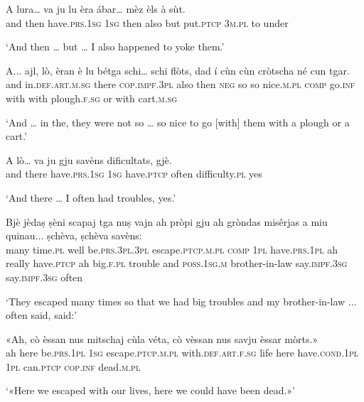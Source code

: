 \begin{linenumbers}
\gll   A lura… va ju lu èra ábar… mèz èls à sùt. \\
and then have.\textsc{prs.1sg} \textsc{1sg} then also but put.\textsc{ptcp} \textsc{3m.pl} to under \\
\end{linenumbers}
\medskip
\glt `And then … but … I also happened to yoke them.'
\medskip

\begin{linenumbers}
\gll  A... ajl, lò, èran è lu bétga schi… schi flòts, dad í cùn cùn cròtscha né cun tgar.\\
and in.\textsc{def.art.m.sg} there \textsc{cop.impf.3pl} also then \textsc{neg} so so nice.\textsc{m.pl} \textsc{comp} go.\textsc{inf} with with plough.\textsc{f.sg} or with cart.\textsc{m.sg}  \\
\end{linenumbers}
\medskip
\glt `And … in the, they were not so … so nice to go [with] them with a plough or a cart.'
\medskip

\begin{linenumbers}
\gll  A lò… va ju gju savèns dificultats, gjè.  \\
and there have.\textsc{prs.1sg} \textsc{1sg} have.\textsc{ptcp} often difficulty.\textsc{pl} yes  \\
\end{linenumbers}
\medskip
\glt `And there … I often had troubles, yes.'
\medskip

\begin{linenumbers}
\gll  Bjè jèdaṣ ṣèni scapaj tga nuṣ vajn ah pròpi gju ah gròndas misêrjas a miu quinau... ṣchèva, ṣchèva savèns:  \\
many time.\textsc{pl} well be.\textsc{prs.3pl.3pl} escape.\textsc{ptcp.m.pl} \textsc{comp} \textsc{1pl}   have.\textsc{prs.1pl} ah really have.\textsc{ptcp} ah big.\textsc{f.pl} trouble and \textsc{poss.1sg.m}  brother-in-law say.\textsc{impf.3sg} say.\textsc{impf.3sg} often  \\
\end{linenumbers}
\medskip
\glt `They escaped many times so that we had big troubles and my brother-in-law ... often said, said:'
\medskip

\begin{linenumbers}
\gll «Ah, cò èssan nus mitschaj cùla véta, cò vèssan nus savju èssar mòrts.»\\
ah here be.\textsc{prs.1pl} \textsc{1sg} escape.\textsc{ptcp.m.pl} with.\textsc{def.art.f.sg} life here have.\textsc{cond.1pl} \textsc{1pl}  can.\textsc{ptcp} \textsc{cop.inf} dead.\textsc{m.pl}\\
\end{linenumbers}
\medskip
\glt `«Here we escaped with our lives, here we could have been dead.»'
\medskip

